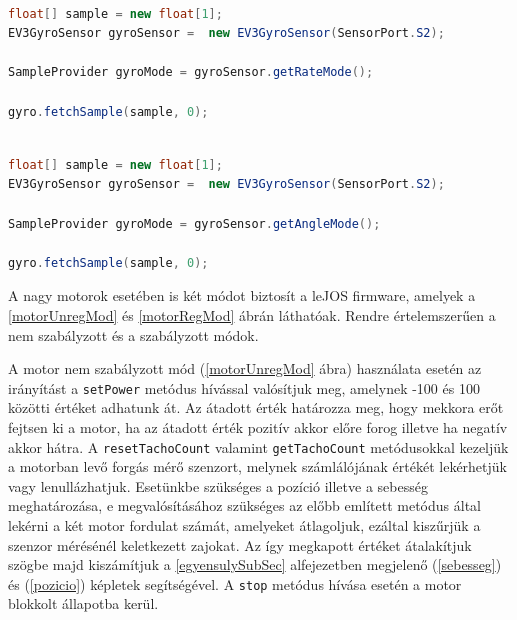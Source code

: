 \begin{lstlisting}[label=gyroRateMod, caption= Giroszkóp szenzor \texttt{rate} mód használata, language=Java]

float[] sample = new float[1];
EV3GyroSensor gyroSensor =  new EV3GyroSensor(SensorPort.S2);

SampleProvider gyroMode = gyroSensor.getRateMode();

gyro.fetchSample(sample, 0);

\end{lstlisting}

\begin{lstlisting}[label=gyroAngleMod, caption= Giroszkóp szenzor \texttt{angle} mód használata, language=Java]

float[] sample = new float[1];
EV3GyroSensor gyroSensor =  new EV3GyroSensor(SensorPort.S2);

SampleProvider gyroMode = gyroSensor.getAngleMode();

gyro.fetchSample(sample, 0);

\end{lstlisting}

A nagy motorok esetében is két módot biztosít a leJOS firmware, amelyek a \ref{motorUnregMod} és \ref{motorRegMod} ábrán láthatóak. Rendre értelemszerűen a nem szabályzott és a szabályzott módok. 

A motor nem szabályzott mód (\ref{motorUnregMod} ábra) használata esetén az irányítást a \texttt{setPower} metódus hívással valósítjuk meg, amelynek -100 és 100 közötti értéket adhatunk át. Az átadott érték határozza meg, hogy mekkora erőt fejtsen ki a motor, ha az átadott érték pozitív akkor előre forog illetve ha negatív akkor hátra. A \texttt{resetTachoCount} valamint \texttt{getTachoCount} metódusokkal kezeljük a motorban levő forgás mérő szenzort, melynek számlálójának értékét lekérhetjük vagy lenullázhatjuk. Esetünkbe szükséges a pozíció illetve a sebesség meghatározása, e megvalósításához szükséges az előbb említett metódus által lekérni a két motor fordulat számát, amelyeket átlagoljuk, ezáltal kiszűrjük a szenzor mérésénél keletkezett zajokat. Az így megkapott értéket átalakítjuk szögbe majd kiszámítjuk a \ref{egyensulySubSec} alfejezetben megjelenő (\ref{sebesseg}) és (\ref{pozicio}) képletek segítségével. A \texttt{stop} metódus hívása esetén a motor blokkolt állapotba kerül.    

